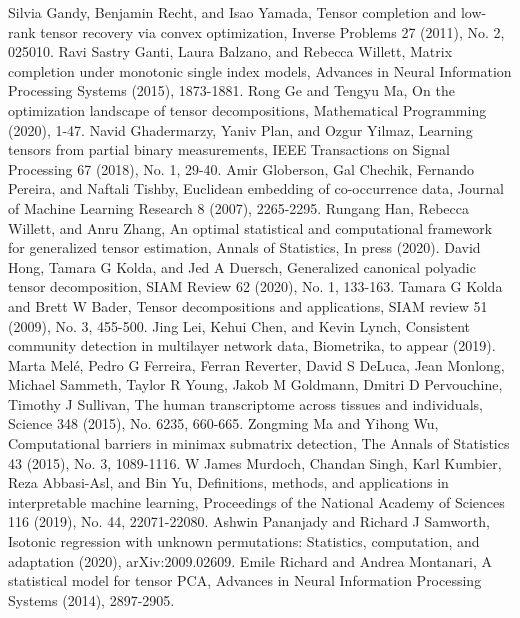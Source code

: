 \documentclass[11pt]{article}
\theoremstyle{exampstyle}
\theoremstyle{definition}
\begin{document}
{\begin{thebibliography}{9}
Silvia Gandy, Benjamin Recht, and Isao Yamada, Tensor completion and low-rank tensor recovery via convex optimization, Inverse Problems 27 (2011), No. 2, 025010.
Ravi Sastry Ganti, Laura Balzano, and Rebecca Willett, Matrix completion under monotonic single index models, Advances in Neural Information Processing Systems (2015), 1873-1881.
Rong Ge and Tengyu Ma, On the optimization landscape of tensor decompositions, Mathematical Programming (2020), 1-47.
Navid Ghadermarzy, Yaniv Plan, and Ozgur Yilmaz, Learning tensors from partial binary measurements, IEEE Transactions on Signal Processing 67 (2018), No. 1, 29-40.
Amir Globerson, Gal Chechik, Fernando Pereira, and Naftali Tishby, Euclidean embedding of co-occurrence data, Journal of Machine Learning Research 8 (2007), 2265-2295.
Rungang Han, Rebecca Willett, and Anru Zhang, An optimal statistical and computational framework for generalized tensor estimation, Annals of Statistics, In press (2020).
David Hong, Tamara G Kolda, and Jed A Duersch, Generalized canonical polyadic tensor decomposition, SIAM Review 62 (2020), No. 1, 133-163.
Tamara G Kolda and Brett W Bader, Tensor decompositions and applications, SIAM review 51 (2009), No. 3, 455-500. 
Jing Lei, Kehui Chen, and Kevin Lynch, Consistent community detection in multilayer network data, Biometrika, to appear (2019).
Marta Mel\'e, Pedro G Ferreira, Ferran Reverter, David S DeLuca, Jean Monlong, Michael Sammeth, Taylor R Young, Jakob M Goldmann, Dmitri D Pervouchine, Timothy J Sullivan, The human transcriptome across tissues and individuals, Science 348 (2015), No. 6235, 660-665.
Zongming Ma and Yihong Wu, Computational barriers in minimax submatrix detection, The Annals of Statistics 43 (2015), No. 3, 1089-1116.
W James Murdoch, Chandan Singh, Karl Kumbier, Reza Abbasi-Asl, and Bin Yu, Definitions, methods, and applications in interpretable machine learning, Proceedings of the National Academy of Sciences 116 (2019), No. 44, 22071-22080.
Ashwin Pananjady and Richard J Samworth, Isotonic regression with unknown permutations: Statistics, computation, and adaptation (2020), arXiv:2009.02609.
Emile Richard and Andrea Montanari, A statistical model for tensor PCA, Advances in Neural Information Processing Systems (2014), 2897-2905.

\end{thebibliography}}
\end{document}
